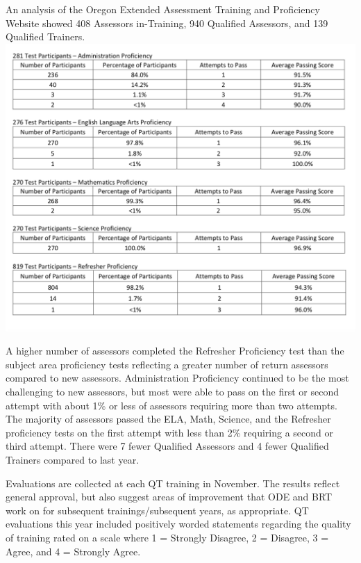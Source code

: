 \documentclass[]{article}
\begin{document}
An analysis of the Oregon Extended Assessment Training and Proficiency
Website showed 408 Assessors in-Training, 940 Qualified Assessors, and
139 Qualified Trainers. \FloatBarrier
\includegraphics{Figures/TestPartic/TestParticipants.png}

A higher number of assessors completed the Refresher Proficiency test
than the subject area proficiency tests reflecting a greater number of
return assessors compared to new assessors. Administration Proficiency
continued to be the most challenging to new assessors, but most were
able to pass on the first or second attempt with about 1\% or less of
assessors requiring more than two attempts. The majority of assessors
passed the ELA, Math, Science, and the Refresher proficiency tests on
the first attempt with less than 2\% requiring a second or third
attempt. There were 7 fewer Qualified Assessors and 4 fewer Qualified
Trainers compared to last year.

Evaluations are collected at each QT training in November. The results
reflect general approval, but also suggest areas of improvement that ODE
and BRT work on for subsequent trainings/subsequent years, as
appropriate. QT evaluations this year included positively worded
statements regarding the quality of training rated on a scale where 1 =
Strongly Disagree, 2 = Disagree, 3 = Agree, and 4 = Strongly Agree.
\end{document}
